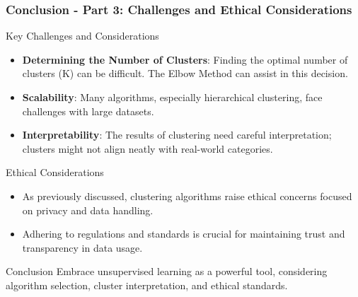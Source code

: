 \documentclass[aspectratio=169]{beamer}
\begin{document}
\begin{frame}[fragile]
  \frametitle{Conclusion - Part 3: Challenges and Ethical Considerations}
    
    \begin{block}{Key Challenges and Considerations}
        \begin{itemize}
            \item \textbf{Determining the Number of Clusters}: Finding the optimal number of clusters (K) can be difficult. The Elbow Method can assist in this decision.
            \item \textbf{Scalability}: Many algorithms, especially hierarchical clustering, face challenges with large datasets.
            \item \textbf{Interpretability}: The results of clustering need careful interpretation; clusters might not align neatly with real-world categories.
        \end{itemize}
    \end{block}
    
    \begin{block}{Ethical Considerations}
        \begin{itemize}
            \item As previously discussed, clustering algorithms raise ethical concerns focused on privacy and data handling.
            \item Adhering to regulations and standards is crucial for maintaining trust and transparency in data usage.
        \end{itemize}
    \end{block}
    
    \begin{block}{Conclusion}
        Embrace unsupervised learning as a powerful tool, considering algorithm selection, cluster interpretation, and ethical standards.
    \end{block}
\end{frame}
\end{document}
